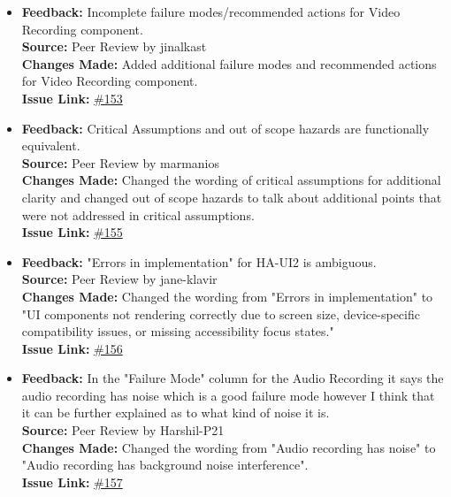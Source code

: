 \documentclass{article}
\begin{document}
\begin{itemize}
      \item 
      \textbf{Feedback:} Incomplete failure modes/recommended actions for Video Recording component. \\
      \textbf{Source:} Peer Review by jinalkast \\
      \textbf{Changes Made:} Added additional failure modes and recommended actions for Video Recording component. \\
      \textbf{Issue Link:} \href{https://github.com/parishanizam/TeleHealth/issues/153}{\#153}

      \item 
      \textbf{Feedback:} Critical Assumptions and out of scope hazards are functionally equivalent. \\
      \textbf{Source:} Peer Review by marmanios \\
      \textbf{Changes Made:} Changed the wording of critical assumptions for additional clarity and changed out of scope hazards to talk about additional points that were not addressed in critical assumptions. \\
      \textbf{Issue Link:} \href{https://github.com/parishanizam/TeleHealth/issues/155}{\#155}

      \item 
      \textbf{Feedback:} "Errors in implementation" for HA-UI2 is ambiguous. \\
      \textbf{Source:} Peer Review by jane-klavir \\
      \textbf{Changes Made:} Changed the wording from "Errors in implementation" to "UI components not rendering correctly due to screen size, device-specific compatibility issues, or missing accessibility focus states." \\
      \textbf{Issue Link:} \href{https://github.com/parishanizam/TeleHealth/issues/156}{\#156}

      \item 
      \textbf{Feedback:} In the "Failure Mode" column for the Audio Recording it says the audio recording has noise which is a good failure mode however I think that it can be further explained as to what kind of noise it is. \\
      \textbf{Source:} Peer Review by Harshil-P21 \\
      \textbf{Changes Made:} Changed the wording from "Audio recording has noise" to "Audio recording has background noise interference". \\
      \textbf{Issue Link:} \href{https://github.com/parishanizam/TeleHealth/issues/157}{\#157}


\end{itemize}
\end{document}
